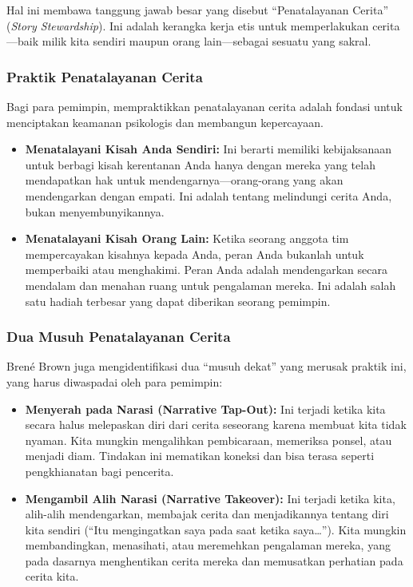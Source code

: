 \documentclass[
  letterpaper,
  DIV=11,
  numbers=noendperiod]{scrreprt}
\begin{document}
Hal ini membawa tanggung jawab besar yang disebut ``Penatalayanan
Cerita'' (\emph{Story Stewardship}). Ini adalah kerangka kerja etis
untuk memperlakukan cerita---baik milik kita sendiri maupun orang
lain---sebagai sesuatu yang sakral.

\subsubsection{\texorpdfstring{\textbf{Praktik Penatalayanan
Cerita}}{Praktik Penatalayanan Cerita}}\label{praktik-penatalayanan-cerita}

Bagi para pemimpin, mempraktikkan penatalayanan cerita adalah fondasi
untuk menciptakan keamanan psikologis dan membangun kepercayaan.

\begin{itemize}
\item
  \textbf{Menatalayani Kisah Anda Sendiri:} Ini berarti memiliki
  kebijaksanaan untuk berbagi kisah kerentanan Anda hanya dengan mereka
  yang telah mendapatkan hak untuk mendengarnya---orang-orang yang akan
  mendengarkan dengan empati. Ini adalah tentang melindungi cerita Anda,
  bukan menyembunyikannya.
\item
  \textbf{Menatalayani Kisah Orang Lain:} Ketika seorang anggota tim
  mempercayakan kisahnya kepada Anda, peran Anda bukanlah untuk
  memperbaiki atau menghakimi. Peran Anda adalah mendengarkan secara
  mendalam dan menahan ruang untuk pengalaman mereka. Ini adalah salah
  satu hadiah terbesar yang dapat diberikan seorang pemimpin.
\end{itemize}

\subsubsection{\texorpdfstring{\textbf{Dua Musuh Penatalayanan
Cerita}}{Dua Musuh Penatalayanan Cerita}}\label{dua-musuh-penatalayanan-cerita}

Brené Brown juga mengidentifikasi dua ``musuh dekat'' yang merusak
praktik ini, yang harus diwaspadai oleh para pemimpin:

\begin{itemize}
\item
  \textbf{Menyerah pada Narasi (Narrative Tap-Out):} Ini terjadi ketika
  kita secara halus melepaskan diri dari cerita seseorang karena membuat
  kita tidak nyaman. Kita mungkin mengalihkan pembicaraan, memeriksa
  ponsel, atau menjadi diam. Tindakan ini mematikan koneksi dan bisa
  terasa seperti pengkhianatan bagi pencerita.
\item
  \textbf{Mengambil Alih Narasi (Narrative Takeover):} Ini terjadi
  ketika kita, alih-alih mendengarkan, membajak cerita dan menjadikannya
  tentang diri kita sendiri (``Itu mengingatkan saya pada saat ketika
  saya\ldots{}''). Kita mungkin membandingkan, menasihati, atau
  meremehkan pengalaman mereka, yang pada dasarnya menghentikan cerita
  mereka dan memusatkan perhatian pada cerita kita.
\end{itemize}
\end{document}
